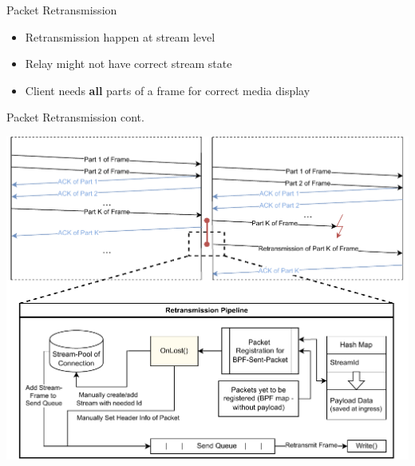 \documentclass[shortpres,aspectratio=43]{beamer}
\newlength{\mylength}
\begin{document}
\fi


\begin{frame}{Packet Retransmission}
    \begin{minipage}{\textwidth}
        \begin{itemize}
            \item Retransmission happen at stream level
            \vspace{2\mylength}
            \item Relay might not have correct stream state
            \vspace{2\mylength}
            \item Client needs \textbf{all} parts of a frame for correct media display
        \end{itemize}
    \end{minipage}
\end{frame}

\begin{frame}{Packet Retransmission cont.}
    \begin{minipage}{\textwidth}
        \centering
        \includegraphics[scale=0.5]{figures/retransmission-presentation.drawio.pdf}
    \end{minipage}
\end{frame}
\end{document}
